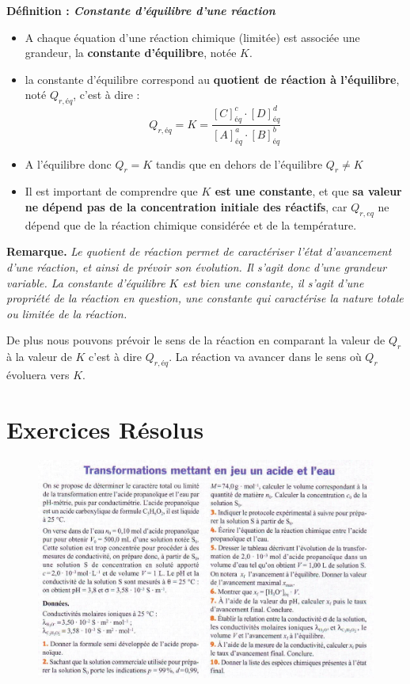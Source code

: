 \documentclass[11pt,a4paper]{article}
\newenvironment{defn}[1]
 {\begin{leftbar}\noindent \textbf{Définition :\textit{ \quad #1}} } { \end{leftbar}}
\newenvironment{rmrq}
 {\begin{shaded} \textbf{Remarque.\quad } \itshape } { \end{shaded}}
\begin{document}
\begin{defn}{Constante d'équilibre d'une réaction}
\begin{itemize}
    \item A chaque équation d’une réaction chimique (limitée) est associée une grandeur, la \textbf{constante d’équilibre}, notée $K$.  
    \item la constante d'équilibre correspond au \textbf{quotient de réaction à l'équilibre}, noté $Q_{r,éq}$, c'est à dire : 
        \[
    Q_{r,éq} = K = \dfrac{\left[C\right]^c_{éq}\cdot\left[D\right]^d_{éq}}{\left[A\right]^a_{éq}\cdot\left[B\right]^b_{éq}}
    \]
    \item A l'équilibre donc $Q_r = K$ tandis que en dehors de l’équilibre $Q_r \neq K$
    \item Il est important de comprendre que \textbf{$K$ est une constante}, et que \textbf{sa valeur ne dépend pas de la concentration initiale des réactifs}, car $Q_{r,eq}$  ne dépend que de la réaction chimique considérée et de la température. 
\end{itemize}
\end{defn}

\begin{rmrq}
Le quotient de réaction permet de caractériser l'état d'avancement d'une réaction, et ainsi de prévoir son évolution. Il s'agit donc d'une grandeur variable. La constante d'équilibre $K$ est bien une constante, il s'agit d'une propriété de la réaction en question, une constante qui caractérise la nature totale ou limitée de la réaction. 

De plus nous pouvons prévoir le sens de la réaction en comparant la valeur de $Q_r$ à la valeur de $K$ c'est à dire $Q_{r,éq}$.  La réaction va avancer dans le sens où $Q_r$  évoluera vers $K$. 
\end{rmrq}

\centering
\section*{Exercices Résolus}
\begin{figure}[h]
    \centering
    \includegraphics[width=\linewidth]{imgs/c2/xo1.jpg}
\end{figure}
\end{document}
